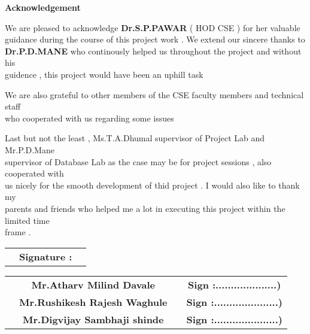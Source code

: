 \documentclass[12pt]{article}
\begin{document}
\begin{center}
 \Large \textbf {Acknowledgement}\\[30mm]
 \end{center}\par
 We are pleased to acknowledge \textbf{Dr.S.P.PAWAR} ( HOD CSE ) for her valuable \\[1mm]
 guidance during the course of this project work . We extend our sincere thanks to \\[1mm]
 \textbf{Dr.P.D.MANE} who continously helped us throughout the project and without his\\[1mm]
  guidence , this project would have been an uphill task\\[5mm]\par
We are also grateful to other members of the CSE faculty members and technical staff\\[1mm]
 who cooperated with us regarding some issues\\[5mm]\par 
Last but not the least , Ms.T.A.Dhumal supervisor of Project Lab and Mr.P.D.Mane\\[1mm]
 supervisor of Database Lab as the case may be for project sessions , also cooperated with\\[1mm]
  us nicely for the smooth development of thid project . I would also like to thank my\\[1mm]
   parents and friends who helped me a lot in executing this project within the limited time\\[1mm]
    frame . \\[40mm]
   
\begin{tabular}{ c c c } 
  \hspace{3.4in} & \large \textbf{Signature : } \\ [5mm] 
 \end{tabular}      
    
   
 \begin{tabular}{ c c c c } 
  \hspace{1.1in}&\textbf{Mr.Atharv Milind Davale} & \hspace{0.5in}  & \textbf{ Sign :....................)} \\ [1mm] 
  \hspace{1.1in} &\textbf {Mr.Rushikesh Rajesh Waghule}& \hspace{0.5in}   & \textbf{Sign :.....................) }\\[1mm]
  \hspace{1.1in}  &\textbf{ Mr.Digvijay Sambhaji shinde } & \hspace{0.5in}  & \textbf{Sign :.....................) }\\[7mm]
 \end{tabular}   
\end{document}
